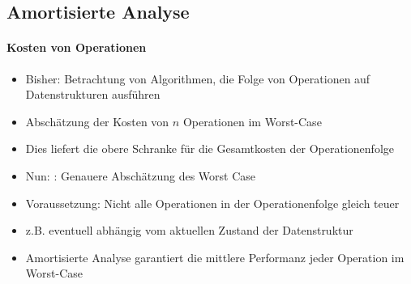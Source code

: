 \documentclass[
    ngerman,
    color=3b,
    load_common, %
    summary,
    boxarc,
]{rubos-tuda-template}
\begin{document}
\clearpage

\subsection{Amortisierte Analyse}
\paragraph{Kosten von Operationen}
\begin{itemize}
    \item Bisher: Betrachtung von Algorithmen, die Folge von Operationen auf Datenstrukturen ausführen
    \item Abschätzung der Kosten von $n$ Operationen im Worst-Case
    \item Dies liefert die obere Schranke für die Gesamtkosten der Operationenfolge
    \item Nun: : Genauere Abschätzung des Worst Case
    \item Voraussetzung: Nicht alle Operationen in der Operationenfolge gleich teuer
    \item z.B. eventuell abhängig vom aktuellen Zustand der Datenstruktur
    \item Amortisierte Analyse garantiert die mittlere Performanz jeder Operation im Worst-Case
\end{itemize}
\end{document}
